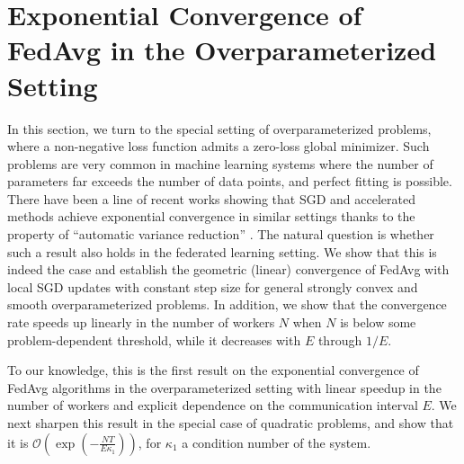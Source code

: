 


\section{Exponential Convergence of FedAvg in the Overparameterized Setting}
\label{sec:overparameterized}

In this section, we turn to the special setting of overparameterized
problems, where a non-negative loss function admits a zero-loss global
minimizer. Such problems are very common in machine learning systems
where the number of parameters far exceeds the number of data points,
and perfect fitting is possible. There have been a line of recent
works showing that SGD and accelerated methods achieve exponential
convergence in similar settings thanks to the property of ``automatic
variance reduction'' \cite{ma2017power,moulines2011non,needell2014stochastic,schmidt2013fast,strohmer2009randomized}.
The natural question is whether such a result also holds in the federated
learning setting. We show that this is indeed the case and establish
the geometric (linear) convergence of FedAvg with local SGD updates
with constant step size for general strongly convex and smooth overparameterized
problems. In addition, we show that the convergence rate speeds up
linearly in the number of workers $N$ when $N$ is below some problem-dependent
threshold, while it decreases with $E$ through $1/E$. 

To our knowledge, this is the first result on the exponential convergence
of FedAvg algorithms in the overparameterized setting with linear
speedup in the number of workers and explicit dependence on the communication
interval $E$. We next sharpen this result in the special case of
quadratic problems, and show that it is $\mathcal{O}(\exp(-\frac{NT}{E\kappa_{1}}))$,
for $\kappa_{1}$ a condition number of the system.

